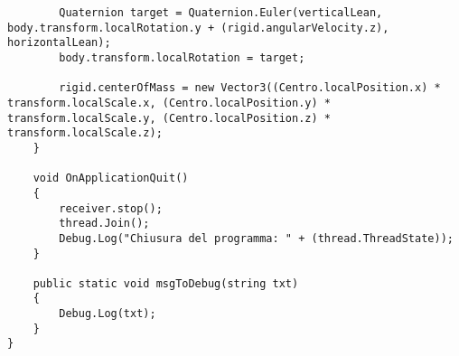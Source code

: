 \begin{lstlisting}
        Quaternion target = Quaternion.Euler(verticalLean, body.transform.localRotation.y + (rigid.angularVelocity.z), horizontalLean);
        body.transform.localRotation = target;

        rigid.centerOfMass = new Vector3((Centro.localPosition.x) * transform.localScale.x, (Centro.localPosition.y) * transform.localScale.y, (Centro.localPosition.z) * transform.localScale.z);
    }

    void OnApplicationQuit()
    {
        receiver.stop();
        thread.Join();
        Debug.Log("Chiusura del programma: " + (thread.ThreadState));
    }

    public static void msgToDebug(string txt)
    {
        Debug.Log(txt);
 	}
}
\end{lstlisting}